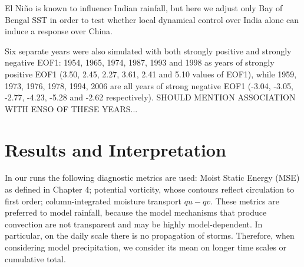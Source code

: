 El Ni\~no is known to influence Indian rainfall, but here we adjust only Bay of Bengal SST in order to test whether local dynamical control over India alone can induce a response over China.

Six separate years were also simulated with both strongly positive and strongly negative EOF1: 1954, 1965, 1974, 1987, 1993 and 1998 as years of strongly positive EOF1 (3.50, 2.45, 2.27, 3.61, 2.41 and 5.10 values of EOF1), while 1959, 1973, 1976, 1978, 1994, 2006 are all years of strong negative EOF1 (-3.04, -3.05, -2.77, -4.23, -5.28 and -2.62 respectively). SHOULD MENTION ASSOCIATION WITH ENSO OF THESE YEARS...

\section{Results and Interpretation}
In our runs the following diagnostic metrics are used: Moist Static Energy (MSE) as defined in Chapter 4; potential vorticity, whose contours reflect circulation to first order; column-integrated moisture transport $qu-qv$. These metrics are preferred to model rainfall, because the model mechanisms that produce convection are not transparent and may be highly model-dependent. In particular, on the daily scale there is no propagation of storms. Therefore, when considering model precipitation, we consider its mean on longer time scales or cumulative total.
